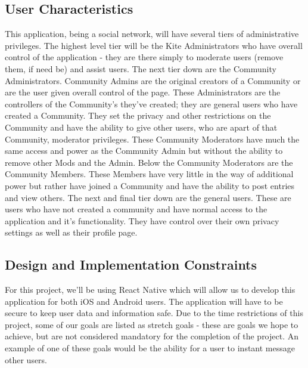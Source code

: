 \documentclass[letterpaper, 10, draftclsnofoot, onecolumn]{IEEEtran}
\begin{document}

\subsection{User Characteristics}
This application, being a social network, will have several tiers of administrative privileges. The highest level tier will be the Kite Administrators who have overall control of the application - they are there simply to moderate users (remove them, if need be) and assist users. The next tier down are the Community Administrators. Community Admins are the original creators of a Community or are the user given overall control of the page. These Administrators are the controllers of the Community's they've created; they are general users who have created a Community. They set the privacy and other restrictions on the Community and have the ability to give other users, who are apart of that Community, moderator privileges. These Community Moderators have much the same access and power as the Community Admin but without the ability to remove other Mods and the Admin. Below the Community Moderators are the Community Members. These Members have very little in the way of additional power but rather have joined a Community and have the ability to post entries and view others. The next and final tier down are the general users. These are users who have not created a community and have normal access to the application and it's functionality. They have control over their own privacy settings as well as their profile page. 

\subsection{Design and Implementation Constraints}
For this project, we'll be using React Native which will allow us to develop this application for both iOS and Android users. The application will have to be secure to keep user data and information safe. Due to the time restrictions of this project, some of our goals are listed as stretch goals - these are goals we hope to achieve, but are not considered mandatory for the completion of the project. An example of one of these goals would be the ability for a user to instant message other users. 
\end{document}
